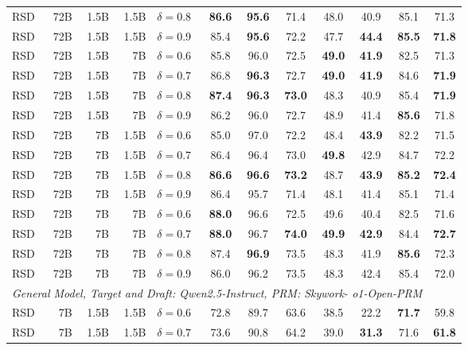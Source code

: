 \documentclass{article}
\theoremstyle{plain}
\theoremstyle{definition}
\theoremstyle{remark}
\begin{document}
\begin{table}[h!]
\begin{center}
\begin{tabular}{lrrrlccccccc}
RSD & 72B & 1.5B & 1.5B & $\delta=0.8$ & \textbf{86.6} & \textbf{95.6} & 71.4 & 48.0 & 40.9 & 85.1 & 71.3 \\
RSD & 72B & 1.5B & 1.5B & $\delta=0.9$ & 85.4 & \textbf{95.6} & 72.2 & 47.7 & \textbf{44.4} & \textbf{85.5} & \textbf{71.8} \\
\cmidrule(lr){1-12}
RSD & 72B & 1.5B & 7B & $\delta=0.6$ & 85.8 & 96.0 & 72.5 & \textbf{49.0} & \textbf{41.9} & 82.5 & 71.3 \\
RSD & 72B & 1.5B & 7B & $\delta=0.7$ & 86.8 & \textbf{96.3} & 72.7 & \textbf{49.0} & \textbf{41.9} & 84.6 & \textbf{71.9} \\
RSD & 72B & 1.5B & 7B & $\delta=0.8$ & \textbf{87.4} & \textbf{96.3} & \textbf{73.0} & 48.3 & 40.9 & 85.4 & \textbf{71.9} \\
RSD & 72B & 1.5B & 7B & $\delta=0.9$ & 86.2 & 96.0 & 72.7 & 48.9 & 41.4 & \textbf{85.6} & 71.8 \\
\cmidrule(lr){1-12}
RSD & 72B & 7B & 1.5B & $\delta=0.6$ & 85.0 & 97.0 & 72.2 & 48.4 & \textbf{43.9} & 82.2 & 71.5 \\
RSD & 72B & 7B & 1.5B & $\delta=0.7$ & 86.4 & 96.4 & 73.0 & \textbf{49.8} & 42.9 & 84.7 & 72.2 \\
RSD & 72B & 7B & 1.5B & $\delta=0.8$ & \textbf{86.6} & \textbf{96.6} & \textbf{73.2} & 48.7 & \textbf{43.9} & \textbf{85.2} & \textbf{72.4} \\
RSD & 72B & 7B & 1.5B & $\delta=0.9$ & 86.4 & 95.7 & 71.4 & 48.1 & 41.4 & 85.1 & 71.4 \\
\cmidrule(lr){1-12}
RSD & 72B & 7B & 7B & $\delta=0.6$ & \textbf{88.0} & 96.6 & 72.5 & 49.6 & 40.4 & 82.5 & 71.6 \\
RSD & 72B & 7B & 7B & $\delta=0.7$ & \textbf{88.0} & 96.7 & \textbf{74.0} & \textbf{49.9} & \textbf{42.9} & 84.4 & \textbf{72.7} \\
RSD & 72B & 7B & 7B & $\delta=0.8$ & 87.4 & \textbf{96.9} & 73.5 & 48.3 & 41.9 & \textbf{85.6} & 72.3 \\
RSD & 72B & 7B & 7B & $\delta=0.9$ & 86.0 & 96.2 & 73.5 & 48.3 & 42.4 & 85.4 & 72.0 \\
\midrule
\multicolumn{11}{c}{\textit{General Model, Target and Draft: Qwen2.5-Instruct, PRM: Skywork-
o1-Open-PRM}} \\
\midrule
RSD & 7B & 1.5B & 1.5B & $\delta=0.6$ & 72.8 & 89.7 & 63.6 & 38.5 & 22.2 & \textbf{71.7} & 59.8 \\
RSD & 7B & 1.5B & 1.5B & $\delta=0.7$ & 73.6 & 90.8 & 64.2 & 39.0 & \textbf{31.3} & 71.6 & \textbf{61.8} \\

\end{tabular}
\end{center}
\end{table}
\end{document}
